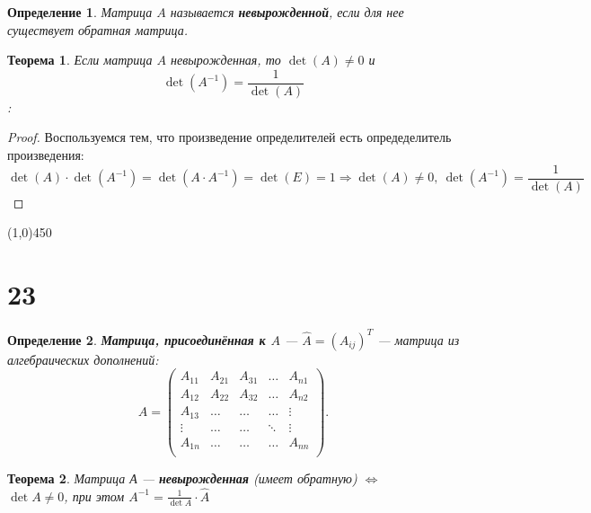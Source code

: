 \documentclass[a4paper,12pt]{article}
\newtheorem*{definition}{Определение}
\newtheorem*{theorem}{Теорема}
\begin{document}
	\begin{definition}
		Матрица $A$ называется \textbf{невырожденной}, если для нее существует обратная матрица.
	\end{definition}
	\begin{theorem}
		Если матрица $A$ невырожденная, то $\det(A) \neq 0$ и \[\det(A^{-1})= \frac{1}{\det(A)}\]:
	\end{theorem}
	\begin{proof} Воспользуемся тем, что произведение определителей есть опредеделитель произведения:
		\[\det(A) \cdot \det(A^{-1}) = \det(A\cdot A^{-1}) = \det(E) = 1 \Rightarrow \det(A) \neq 0,\ \det(A^{-1})= \frac{1}{\det(A)}\]
	\end{proof}
	\begin{center}
		\line(1,0){450}
	\end{center}
	\section*{23}
	\begin{definition}
		\textbf{Матрица, присоединённая к $A$} — $\hat{A} = (A_{ij})^T$ — матрица из алгебраических дополнений: 
		\[\hat A = \begin{pmatrix}
		A_{11} & A_{21} & A_{31} & \ldots & A_{n1} \\
		A_{12} & A_{22} & A_{32} & \ldots & A_{n2} \\
		A_{13} & \ldots & \ldots & \ldots & \vdots \\
		\vdots & \ldots & \ldots & \ddots & \vdots \\
		A_{1n} & \ldots & \ldots & \ldots & A_{nn} \\
		\end{pmatrix}.\]
	\end{definition}
	\begin{theorem}
		Матрица А --- \textbf{невырожденная} (имеет обратную) $\iff$\\ $\det A \neq 0$, при этом $A^{-1} = \displaystyle\frac{1}{\det A} \cdot \hat{A}$
	\end{theorem}
	
\end{document}
